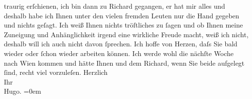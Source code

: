 \begin{ledgroupsized}[t]{13cm}
               traurig erſchienen, ich bin dann zu Richard
               gegangen, er hat mir alles \label{K_L00728_2v}\label{K_L00728_2h} und deshalb habe ich Ihnen
               unter den vielen fremden Leuten nur die Hand gegeben und nichts geſagt. Ich weiß
               Ihnen {\pb}nichts tröſtliches zu ſagen
               und ob Ihnen meine Zuneigung und Anhänglichkeit irgend eine wirkliche Freude macht,
               weiß ich nicht, deshalb will ich auch nicht davon ſprechen. Ich hoffe von Herzen,
               daſs Sie bald wieder oder ſchon wieder arbeiten können. Ich werde {\pb}wohl die nächſte Woche nach Wien kommen und hätte Ihnen und dem Richard, wenn Sie beide aufgelegt ſind, recht viel
               vorzuleſen.\pend
           \pstart
           Herzlich{\\[\baselineskip]}Ihr{\\[\baselineskip]}\spacefill\mbox{Hugo.}\pend
           \leftskip=0em{}          \endnumbering{}\end{ledgroupsized}  \newcommand{\dateiname}{L00728}\newcommand{\titel}{Hugo von Hofmannsthal an Arthur Schnitzler, 3. 10. [1897]}\newcommand{\editorInnen}{Martin Anton Müller und Gerd-Hermann Susen}
            \footnotesize
\begin{ledgroupsized}[t]{11.5cm}
\end{ledgroupsized}
         
      